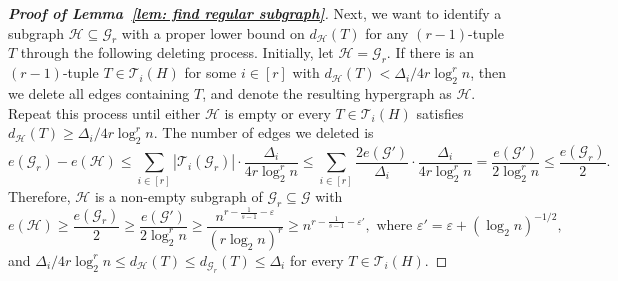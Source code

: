 \documentclass[11pt]{article}
\begin{document}
\begin{proof}[\bf Proof of Lemma~\ref{lem: find regular subgraph}]
Next, we want to identify a subgraph $ \mathcal H\subseteq \mathcal G_r$ with a proper lower bound on $d_{\mathcal H}(T)$ for any $(r-1)$-tuple $T$ through the following deleting process.
Initially, let $ \mathcal H= \mathcal G_r$.
If there is an $(r-1)$-tuple $T\in \mathcal T_i(H)$ for some $i\in [r]$ with $d_{\mathcal H}(T)<\Delta_i/ 4r\log_2^rn$, then we delete all edges containing $T$, and denote the resulting hypergraph as $ \mathcal H$.
Repeat this process until either $ \mathcal H$ is empty or every $T\in \mathcal T_i(H)$ satisfies $d_{\mathcal H}(T)\geq \Delta_i/ 4r\log_2^rn$.
The number of edges we deleted is
$$e(\mathcal G_r)-e(\mathcal H)\le \sum_{ i\in [r]} | \mathcal T_i(\mathcal G_r)|\cdot \frac{\Delta_i}{4r\log_2^rn}
\le \sum_{ i\in [r]}  \frac{2e(\mathcal G')}{\Delta_i}\cdot \frac{\Delta_i}{4r\log_2^rn}=\frac{e(\mathcal G')}{2\log_2^rn}\le \frac{e(\mathcal G_r)}{2}.$$
Therefore, $\mathcal H$ is a non-empty subgraph of $\mathcal G_r\subseteq \mathcal G$ with
$$e(\mathcal H)\ge \frac{e(\mathcal G_r)}{2}\ge \frac{e(\mathcal G')}{2\log_2^rn}\ge \frac{n^{r-\frac{1}{s-1}- \varepsilon}}{(r\log_2n)^r}\ge n^{r-\frac{1}{s-1}- \varepsilon'}, \mbox{ where }\varepsilon'=\varepsilon+(\log_2 n)^{-1/2},$$
and $\Delta_i/4r\log_2^rn \le d_{\mathcal H}(T)\leq d_{\mathcal G_r}(T)\le \Delta_i$ for every $T\in \mathcal T_i(H)$.


\end{proof}
\end{document}
